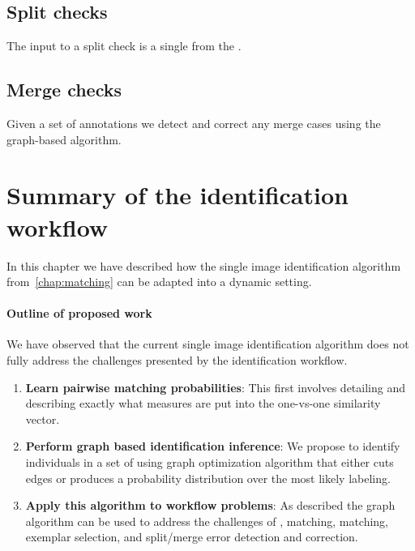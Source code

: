     \subsection{Split checks}
        The input to a split check is a single \name{} from the \masterdatabase{}.
        
    \subsection{Merge checks}
        Given a set of annotations we detect and correct any merge cases using the graph-based algorithm.
        
\section{Summary of the identification workflow}
    In this chapter we have described how the single image identification algorithm from~\cref{chap:matching} can be
      adapted into a dynamic setting.
    
    \paragraph{Outline of proposed work}
    We have observed that the current single image identification algorithm does not fully address the challenges
      presented by the identification workflow.
    \begin{enumerate}
        \item \textbf{Learn pairwise matching probabilities}:
            This first involves detailing and describing exactly what measures are put into the one-vs-one similarity
              vector.
            
        \item \textbf{Perform graph based identification inference}:
            We propose to identify individuals in a set of \annots{} using graph optimization algorithm that either
              cuts edges or produces a probability distribution over the most likely \annot{} labeling.
            
        \item \textbf{Apply this algorithm to workflow problems}:
            As described the graph algorithm can be used to address the challenges of \intraoccurrence{}, matching,
              \vsexemplar{} matching, exemplar selection, and split/merge error detection and correction.
    \end{enumerate}
    

